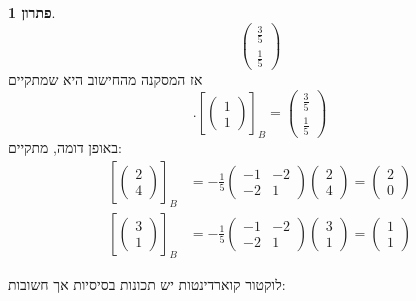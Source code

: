 \documentclass[12pt]{report}
\theoremstyle{plain}
\theoremstyle{definition}
\newtheorem*{solution}{פתרון}
\newcommand{\0}{\mathbf{0}}
\begin{document}
\begin{solution}
$$\begin{pmatrix}
\frac{3}{5} \\
\frac{1}{5}
\end{pmatrix}
$$
אז המסקנה מהחישוב היא שמתקיים
$$
.\left[\begin{pmatrix}
1 \\
1
\end{pmatrix}\right]_B=\begin{pmatrix}
\frac{3}{5} \\
\frac{1}{5}
\end{pmatrix}
$$
באופן דומה, מתקיים:
$$
\begin{aligned}
\left[\begin{pmatrix}
2 \\
4
\end{pmatrix}\right]_B&=-\frac{1}{5}\begin{pmatrix}
-1 & -2 \\
-2 & 1
\end{pmatrix}\begin{pmatrix}
2 \\
4
\end{pmatrix}=\begin{pmatrix}2 \\ 0\end{pmatrix} \\
\left[\begin{pmatrix}
3 \\
1
\end{pmatrix}\right]_B&=-\frac{1}{5}\begin{pmatrix}
-1 & -2 \\
-2 & 1
\end{pmatrix}\begin{pmatrix}
3 \\
1
\end{pmatrix}=\begin{pmatrix}1 \\ 1\end{pmatrix}
\end{aligned}
$$
\end{solution}

לוקטור קוארדינטות יש תכונות בסיסיות אך חשובות:
\end{document}
